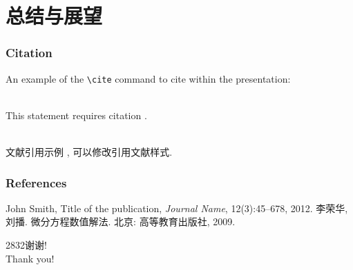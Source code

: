 \documentclass[noamsthm,notheorem,11pt,compress]{beamer}
\makeatletter
\numberwithin{figure}{section}
\numberwithin{table}{section}
\numberwithin{equation}{section}
\theoremstyle{plain} %
\newcommand\HUGE{\@setfontsize\Huge{28}{32}}
\makeatother
\begin{document}
\section{总结与展望}

\begin{frame}[fragile] %
\frametitle{Citation}
An example of the \verb|\cite| command to cite within the presentation:\\~

This statement requires citation \cite{Smith2012}. \\~

文献引用示例 \cite{LiLiu2009}, 可以修改引用文献样式.
\end{frame}



\begin{frame}
\frametitle{References}
\small
\begin{thebibliography}{99} %
 John Smith, Title of the publication, \emph{Journal Name}, 12(3):45--678, 2012.
 李荣华, 刘播. 微分方程数值解法. 北京: 高等教育出版社, 2009.
\end{thebibliography}

\end{frame}




\begin{frame}
\begin{center}
\HUGE \textcolor[RGB]{165,3,3}{谢\quad 谢! \\[8pt]
Thank you!}
\end{center}
\end{frame}


\end{document}
